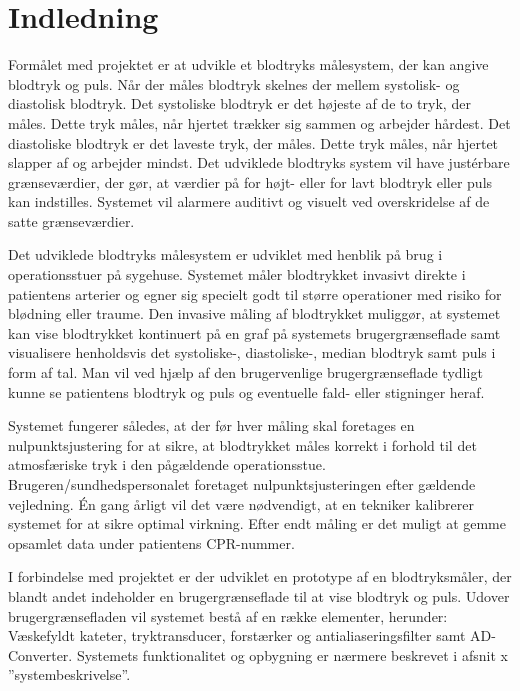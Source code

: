 \chapter{Indledning}
Formålet med projektet er at udvikle et blodtryks målesystem, der kan angive blodtryk og puls. Når der måles blodtryk skelnes der mellem systolisk- og diastolisk blodtryk. Det systoliske blodtryk er det højeste af de to tryk, der måles. Dette tryk måles, når hjertet trækker sig sammen og arbejder hårdest. Det diastoliske blodtryk er det laveste tryk, der måles. Dette tryk måles, når hjertet slapper af og arbejder mindst. Det udviklede blodtryks system vil have justérbare grænseværdier, der gør, at værdier på for højt- eller for lavt blodtryk eller puls kan indstilles. Systemet vil alarmere auditivt og visuelt ved overskridelse af de satte grænseværdier.

Det udviklede blodtryks målesystem er udviklet med henblik på brug i operationsstuer på sygehuse. Systemet måler blodtrykket invasivt direkte i patientens arterier og egner sig specielt godt til større operationer med risiko for blødning eller traume. Den invasive måling af blodtrykket muliggør, at systemet kan vise blodtrykket kontinuert på en graf på systemets brugergrænseflade samt visualisere henholdsvis det systoliske-, diastoliske-, median blodtryk samt puls i form af tal. Man vil ved hjælp af den brugervenlige brugergrænseflade tydligt kunne se patientens blodtryk og puls og eventuelle fald- eller stigninger heraf.

Systemet fungerer således, at der før hver måling skal foretages en nulpunktsjustering for at sikre, at blodtrykket måles korrekt i forhold til det atmosfæriske tryk i den pågældende operationsstue. Brugeren/sundhedspersonalet foretaget nulpunktsjusteringen efter gældende vejledning. Én gang årligt vil det være nødvendigt, at en tekniker kalibrerer systemet for at sikre optimal virkning. Efter endt måling er det muligt at gemme opsamlet data under patientens CPR-nummer.

I forbindelse med projektet er der udviklet en prototype af en blodtryksmåler, der blandt andet indeholder en brugergrænseflade til at vise blodtryk og puls. Udover brugergrænsefladen vil systemet bestå af en række elementer, herunder: Væskefyldt kateter, tryktransducer, forstærker og antialiaseringsfilter samt AD-Converter. Systemets funktionalitet og opbygning er nærmere beskrevet i afsnit x ”systembeskrivelse”.  


